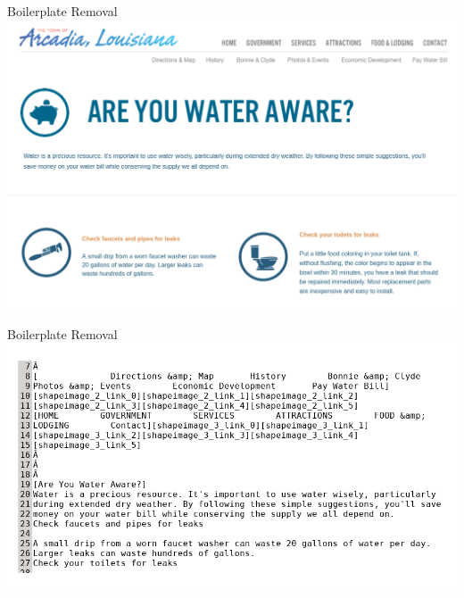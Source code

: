 \documentclass[12pt]{beamer}
\begin{document}

\begin{frame}{Boilerplate Removal}
\includegraphics[width = \linewidth]{arcadia_water.png}
\end{frame}

\begin{frame}{Boilerplate Removal}
\includegraphics[width = \linewidth]{duplicateLines.png}
\end{frame}
\end{document}
